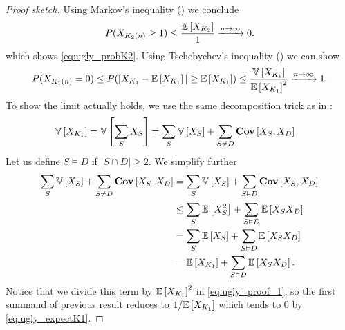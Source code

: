\begin{proof}[Proof sketch]
    Using Markov's inequality () we conclude
    \begin{align}
        P(X_{K_2(n)} \geq 1) \leq \frac{\mathbb{E}\left[X_{K_2}\right]}{1} \xrightarrow{n \rightarrow \infty} 0.
    \end{align}
    which shows \eqref{eq:ugly_probK2}.
    Using Tschebychev's inequality () we can show
    \begin{align} \label{eq:ugly_proof_1}
        P(X_{K_1(n)} = 0) \leq P(|X_{K_1} - \mathbb{E}\left[X_{K_1}\right]| \geq \mathbb{E}\left[X_{K_1}\right]) \leq \frac{\mathbb{V}\left[X_{K_1}\right]}{\mathbb{E}\left[X_{K_1}\right]^2} \xrightarrow{n \rightarrow \infty} 1.
    \end{align}
    To show the limit actually holds, we use the same decomposition trick as in :
    \begin{align}
        \mathbb{V}\left[X_{K_1}\right] = \mathbb{V}\left[\sum_S X_S\right] & = \sum_S \mathbb{V}\left[X_S\right] + \sum_{S \neq D} \mathbf{Cov}\left[X_S,X_D\right]
    \end{align}
    Let us define $S \vDash D$ if $|S \cap D| \geq 2$.
    We simplify further
    \begin{align*}
        \sum_S \mathbb{V}\left[X_S\right] + \sum_{S \neq D} \mathbf{Cov}\left[X_S,X_D\right] & = \sum_S \mathbb{V}\left[X_S\right] + \sum_{S \vDash D} \mathbf{Cov}\left[X_S,X_D\right]    \\
                                                                & \leq \sum_S \mathbb{E}\left[X_S^2\right] + \sum_{S \vDash D} \mathbb{E}\left[X_SX_D\right] \\
                                                                & = \sum_S \mathbb{E}\left[X_S\right] + \sum_{S \vDash D} \mathbb{E}\left[X_SX_D\right]      \\
                                                                & = \mathbb{E}\left[X_{K_1}\right] + \sum_{S \vDash D} \mathbb{E}\left[X_SX_D\right].
    \end{align*}
    Notice that we divide this term by $\mathbb{E}\left[X_{K_1}\right]^2$ in \eqref{eq:ugly_proof_1},
    so the first summand of previous result reduces to $1/\mathbb{E}\left[X_{K_1}\right]$ which tends to 0 by \eqref{eq:ugly_expectK1}.


\end{proof}
